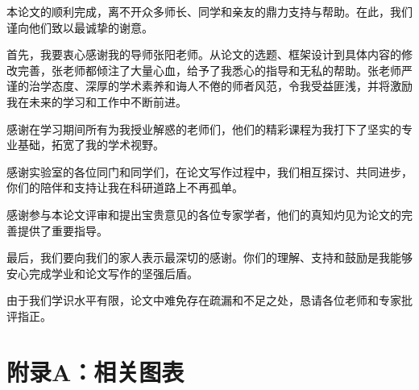 \documentclass[12pt,a4paper]{ctexart}
\begin{document}
本论文的顺利完成，离不开众多师长、同学和亲友的鼎力支持与帮助。在此，我们谨向他们致以最诚挚的谢意。

首先，我要衷心感谢我的导师张阳老师。从论文的选题、框架设计到具体内容的修改完善，张老师都倾注了大量心血，给予了我悉心的指导和无私的帮助。张老师严谨的治学态度、深厚的学术素养和诲人不倦的师者风范，令我受益匪浅，并将激励我在未来的学习和工作中不断前进。

感谢在学习期间所有为我授业解惑的老师们，他们的精彩课程为我打下了坚实的专业基础，拓宽了我的学术视野。

感谢实验室的各位同门和同学们，在论文写作过程中，我们相互探讨、共同进步，你们的陪伴和支持让我在科研道路上不再孤单。

感谢参与本论文评审和提出宝贵意见的各位专家学者，他们的真知灼见为论文的完善提供了重要指导。

最后，我们要向我们的家人表示最深切的感谢。你们的理解、支持和鼓励是我能够安心完成学业和论文写作的坚强后盾。

由于我们学识水平有限，论文中难免存在疏漏和不足之处，恳请各位老师和专家批评指正。\newpage

\clearpage
\thispagestyle{empty} 
\section{附录A：相关图表}
\end{document}
